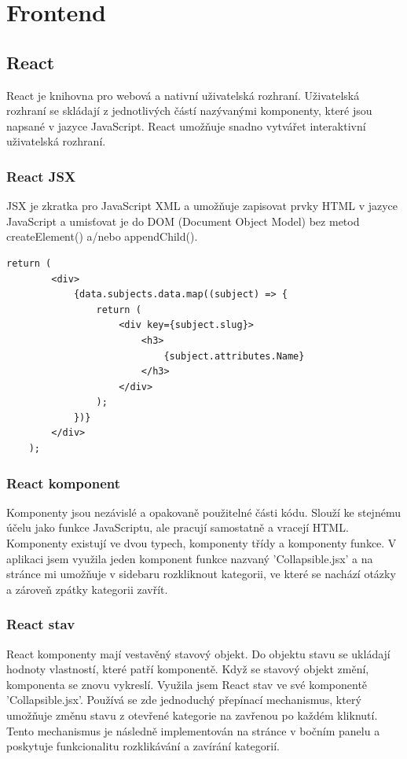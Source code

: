 \documentclass[12pt, a4paper,
oneside,      %
openright
]{report}
\let\oldchapter\chapter
\renewcommand{\chapter}{
	\clearpage %
	\pagestyle{plain} %
	\oldchapter	
}
\begin{document}
\chapter{Frontend}
\label{sec:frontend}

\section{React}
React je knihovna pro webová a nativní uživatelská rozhraní. Uživatelská rozhraní se skládají z jednotlivých částí nazývanými komponenty, které jsou napsané v jazyce JavaScript. React umožňuje snadno vytvářet interaktivní uživatelská rozhraní.

\subsection{React JSX}
JSX je zkratka pro JavaScript XML a umožňuje zapisovat prvky HTML v jazyce JavaScript a umisťovat je do DOM (Document Object Model) bez metod createElement() a/nebo appendChild().

\vspace{10pt}

\begin{lstlisting}[style=JavaScript, title={Kód}, caption={Ukázka využití JSX v page.js}] 
	return (
		<div>
			{data.subjects.data.map((subject) => {
				return (
					<div key={subject.slug}>
						<h3>
							{subject.attributes.Name}
						</h3>
					</div>
				);
			})}
		</div>
	);
\end{lstlisting}

\newpage
\subsection{React komponent}
Komponenty jsou nezávislé a opakovaně použitelné části kódu. Slouží ke stejnému účelu jako funkce JavaScriptu, ale pracují samostatně a vracejí HTML. Komponenty existují ve dvou typech, komponenty třídy a komponenty funkce. V aplikaci jsem využila jeden komponent funkce nazvaný 'Collapsible.jsx' a na stránce mi umožňuje v sidebaru rozkliknout kategorii, ve které se nachází otázky a zároveň zpátky kategorii zavřít.

\subsection{React stav}
React komponenty mají vestavěný stavový objekt. Do objektu stavu se ukládají hodnoty vlastností, které patří komponentě. Když se stavový objekt změní, komponenta se znovu vykreslí. Využila jsem React stav ve své komponentě 'Collapsible.jsx'. Používá se zde jednoduchý přepínací mechanismus, který umožňuje změnu stavu z otevřené kategorie na zavřenou po každém kliknutí. Tento mechanismus je následně implementován na stránce v bočním panelu a poskytuje funkcionalitu rozklikávání a zavírání kategorií.
\end{document}

